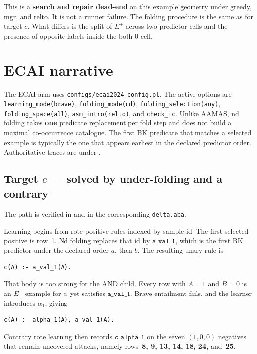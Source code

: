\documentclass[11pt]{article}
\begin{document}
This is a \textbf{search and repair dead-end} on this example geometry under
greedy, mgr, and relto.
It is not a runner failure.
The folding procedure is the same as for target \(c\).
What differs is the split of \(E^+\) across two predictor cells and the
presence of opposite labels inside the both-0 cell.

\section{ECAI narrative}

{\raggedright
The ECAI arm uses \texttt{configs/ecai2024\_config.pl}.
The active options are \texttt{learning\_mode(brave)},
\texttt{folding\_mode(nd)}, \texttt{folding\_selection(any)},
\texttt{folding\_space(all)}, \texttt{asm\_intro(relto)}, and
\texttt{check\_ic}.
Unlike AAMAS, nd folding takes \textbf{one} predicate replacement per fold step
and does not build a maximal co-occurrence catalogue.
The first BK predicate that matches a selected example is typically the one
that appears earliest in the declared predictor order.
Authoritative traces are under
.
\par}

\subsection{Target \texorpdfstring{\(c\)}{c} --- solved by under-folding and a contrary}

The path is verified in
and in the corresponding \texttt{delta.aba}.

Learning begins from rote positive rules indexed by sample id.
The first selected positive is row~1.
Nd folding replaces that id by \(\mathtt{a\_val\_1}\), which is the first BK
predictor under the declared order \(a\), then \(b\).
The resulting unary rule is
\begin{verbatim}
c(A) :- a_val_1(A).
\end{verbatim}
That body is too strong for the AND child.
Every row with \(A=1\) and \(B=0\) is an \(E^-\) example for \(c\), yet
satisfies \(\mathtt{a\_val\_1}\).
Brave entailment fails, and the learner introduces \(\alpha_1\), giving
\begin{verbatim}
c(A) :- alpha_1(A), a_val_1(A).
\end{verbatim}
Contrary rote learning then records \(\mathtt{c\_alpha\_1}\) on the seven
\((1,0,0)\) negatives that remain uncovered attacks, namely
rows~\textbf{8, 9, 13, 14, 18, 24,} and~\textbf{25}.
\end{document}
